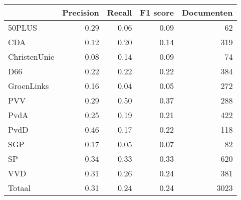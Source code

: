 \begin{tabular}{lrrrr}
\toprule
{} &  Precision &  Recall &  F1 score &  Documenten \\
\midrule
50PLUS       &       0.29 &    0.06 &      0.09 &          62 \\
CDA          &       0.12 &    0.20 &      0.14 &         319 \\
ChristenUnie &       0.08 &    0.14 &      0.09 &          74 \\
D66          &       0.22 &    0.22 &      0.22 &         384 \\
GroenLinks   &       0.16 &    0.04 &      0.05 &         272 \\
PVV          &       0.29 &    0.50 &      0.37 &         288 \\
PvdA         &       0.25 &    0.19 &      0.21 &         422 \\
PvdD         &       0.46 &    0.17 &      0.22 &         118 \\
SGP          &       0.17 &    0.05 &      0.07 &          82 \\
SP           &       0.34 &    0.33 &      0.33 &         620 \\
VVD          &       0.31 &    0.26 &      0.24 &         381 \\
Totaal       &       0.31 &    0.24 &      0.24 &        3023 \\
\bottomrule
\end{tabular}
